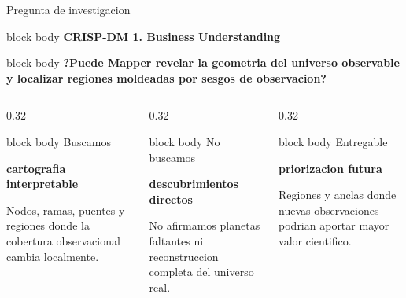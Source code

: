 \documentclass[aspectratio=169,10pt]{beamer}
\newcommand{\phasebar}[1]{
  \begin{beamercolorbox}[wd=\linewidth,sep=0.24em,rounded=true]{block body}
    {\scriptsize\color{accent}\bfseries CRISP-DM \hspace{0.6em}\color{textmuted}#1}
  \end{beamercolorbox}
}
\newcommand{\statcard}[3]{
  \begin{beamercolorbox}[wd=\linewidth,sep=0.34em,rounded=true]{block body}
    {\scriptsize\color{textmuted}#1}\par
    {\fontsize{16}{17}\selectfont\bfseries #2}\par
    {\scriptsize #3}
  \end{beamercolorbox}
}
\begin{document}
\begin{frame}[t]{Pregunta de investigacion}
  \phasebar{1. Business Understanding}
  \vspace{0.12cm}
  \begin{beamercolorbox}[wd=\linewidth,sep=0.72em,rounded=true]{block body}
    \centering
    {\Large\bfseries ?Puede Mapper revelar la geometria del universo observable}\\[0.12cm]
    {\Large\bfseries y localizar regiones moldeadas por sesgos de observacion?}
  \end{beamercolorbox}
  \vspace{0.20cm}
  \begin{columns}[T,onlytextwidth]
    \begin{column}{0.32\textwidth}
      \statcard{Buscamos}{cartografia interpretable}{Nodos, ramas, puentes y regiones donde la cobertura observacional cambia localmente.}
    \end{column}
    \begin{column}{0.32\textwidth}
      \statcard{No buscamos}{descubrimientos directos}{No afirmamos planetas faltantes ni reconstruccion completa del universo real.}
    \end{column}
    \begin{column}{0.32\textwidth}
      \statcard{Entregable}{priorizacion futura}{Regiones y anclas donde nuevas observaciones podrian aportar mayor valor cientifico.}
    \end{column}
  \end{columns}
\end{frame}
\end{document}
